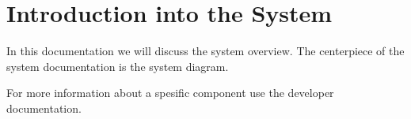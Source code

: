 \author{Tadd\"aus Nauheimer}
\chapter{Introduction into the System}

In this documentation we will discuss the system overview.
The centerpiece of the system documentation is the system diagram.

For more information about a spesific component use the developer documentation.


